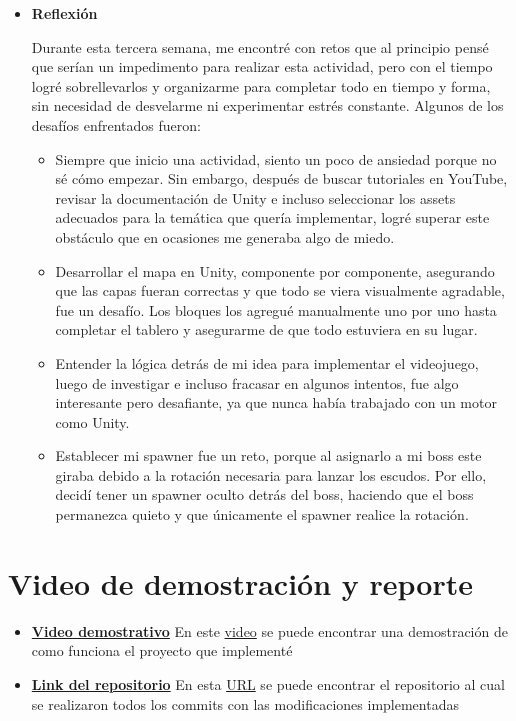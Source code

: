 \documentclass[11pt]{article}
\begin{document}
\begin{itemize}
    \vspace{0.5cm}
    
    \item \textbf{Reflexión}
    \vspace{0.5cm}

    Durante esta tercera semana, me encontré con retos que al principio pensé que serían un impedimento para realizar esta actividad, pero con el tiempo logré sobrellevarlos y organizarme para completar todo en tiempo y forma, sin necesidad de desvelarme ni experimentar estrés constante. Algunos de los desafíos enfrentados fueron: 

    \begin{itemize}
      \item Siempre que inicio una actividad, siento un poco de ansiedad porque no sé cómo empezar. Sin embargo, después de buscar tutoriales en YouTube, revisar la documentación de Unity e incluso seleccionar los assets adecuados para la temática que quería implementar, logré superar este obstáculo que en ocasiones me generaba algo de miedo.
      
      \item Desarrollar el mapa en Unity, componente por componente, asegurando que las capas fueran correctas y que todo se viera visualmente agradable, fue un desafío. Los bloques los agregué manualmente uno por uno hasta completar el tablero y asegurarme de que todo estuviera en su lugar.
      
      \item Entender la lógica detrás de mi idea para implementar el videojuego, luego de investigar e incluso fracasar en algunos intentos, fue algo interesante pero desafiante, ya que nunca había trabajado con un motor como Unity.
      
      \item Establecer mi spawner fue un reto, porque al asignarlo a mi boss este giraba debido a la rotación necesaria para lanzar los escudos. Por ello, decidí tener un spawner oculto detrás del boss, haciendo que el boss permanezca quieto y que únicamente el spawner realice la rotación.
    \end{itemize}

  \end{itemize}

  \section*{Video de demostración y reporte}
  \begin{itemize}
    \item \href{https://youtu.be/X57H45DqY2A}{\textbf{Video demostrativo}}
      En este \href{https://youtu.be/X57H45DqY2A}{video} se puede encontrar una demostración de como funciona el proyecto que implementé
    \item \href{https://github.com/alearredondo09/Medieval_Hell_Shooter?tab=readme-ov-file#assets}{\textbf{Link del repositorio}}
      En esta \href{https://github.com/alearredondo09/Medieval_Hell_Shooter?tab=readme-ov-file#assets}{URL} se puede encontrar el repositorio al cual se realizaron todos los commits con las modificaciones implementadas
  \end{itemize}
\end{document}
